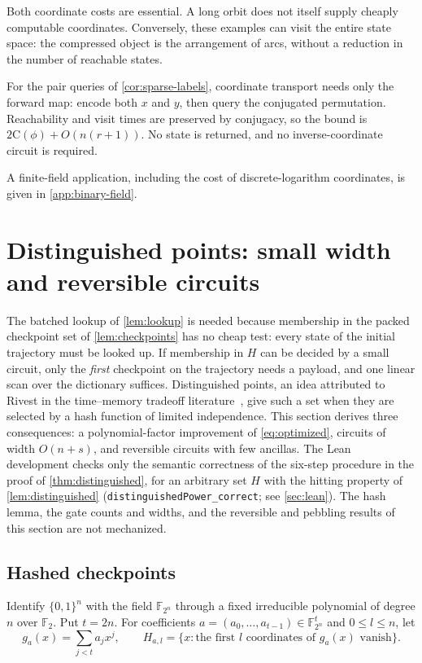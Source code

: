 \documentclass[11pt]{article}
\theoremstyle{definition}
\theoremstyle{remark}
\newcommand{\bits}{\{0,1\}}
\newcommand{\CC}{\mathrm{C}}
\numberwithin{equation}{section}
\begin{document}
Both coordinate costs are essential.  A long orbit does not itself
supply cheaply computable coordinates.  Conversely, these examples can
visit the entire state space: the compressed object is the arrangement
of arcs, without a reduction in the number of reachable states.

For the pair queries of \cref{cor:sparse-labels}, coordinate transport
needs only the forward map: encode both $x$ and $y$, then query the
conjugated permutation.  Reachability and visit times are preserved by
conjugacy, so the bound is $2\CC(\phi)+O(n(r+1))$.  No state is returned,
and no inverse-coordinate circuit is required.

A finite-field application, including the cost of discrete-logarithm
coordinates, is given in \cref{app:binary-field}.

\section{Distinguished points: small width and reversible circuits}
\label{sec:distinguished}

The batched lookup of \cref{lem:lookup} is needed because membership in the
packed checkpoint set of \cref{lem:checkpoints} has no cheap test: every
state of the initial trajectory must be looked up.  If membership in $H$
can be decided by a small circuit, only the \emph{first} checkpoint on the
trajectory needs a payload, and one linear scan over the dictionary
suffices.  Distinguished points, an idea attributed to Rivest in the
time--memory tradeoff literature~\cite{vOW99}, give such a set when they
are selected by a hash function of limited independence.  This section derives three
consequences: a polynomial-factor improvement of \cref{eq:optimized},
circuits of width $O(n+s)$, and reversible circuits with few ancillas.
The Lean development checks only the semantic correctness of the six-step
procedure in the proof of \cref{thm:distinguished}, for an arbitrary set
$H$ with the hitting property of \cref{lem:distinguished}
(\texttt{distinguishedPower\_correct}; see \cref{sec:lean}).  The hash
lemma, the gate counts and widths, and the reversible and pebbling results
of this section are not mechanized.

\subsection{Hashed checkpoints}

Identify $\bits^n$ with the field $\mathbb F_{2^n}$ through a fixed
irreducible polynomial of degree $n$ over $\mathbb F_2$.  Put $t=2n$.  For
coefficients $a=(a_0,\ldots,a_{t-1})\in\mathbb F_{2^n}^t$ and
$0\leq l\leq n$, let
\[
  g_a(x)=\sum_{j<t}a_jx^j,\qquad
  H_{a,l}=\{x:\text{the first $l$ coordinates of $g_a(x)$ vanish}\}.
\]
\end{document}
